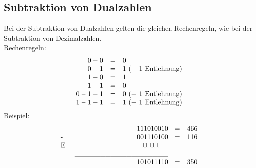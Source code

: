\documentclass[a4paper,12pt,fleqn,oneside]{article}
\begin{document}
	\subsection{Subtraktion von Dualzahlen}
  			Bei der Subtraktion von Dualzahlen gelten die gleichen Rechenregeln, wie bei der Subtraktion von Dezimalzahlen.\\
  			Rechenregeln:
			\[ \begin{array}{rcll}
   				 0 - 0 & = & 0													\\
  			         0 - 1 & = & 1$ (+ 1 Entlehnung)$									\\			
    				 1 - 0 & = & 1													\\
				 1 - 1 & = & 0													\\
    			    0 - 1 - 1 & = & 0$ (+ 1 Entlehnung)$									\\
    			    1 - 1 - 1 & = & 1$ (+ 1 Entlehnung)$
			\end{array} \]
			Beispiel:
			\[ \begin{array}{lrcll}
   					&		 	       	 1 1 1 0 1 0 0 1 0 		& = & 466 			\\
  			       	$- $ &				 0 0 1 1 1 0 1 0 0 		& = & 116				\\
  			       	$E $ &      			            1 1 1 1 1$ $$ $$ $$ $        	 				\\            
    					&	\_\_\_\_\_\_\_\_\_\_\_\_\_\_\_\_\_\_							\\
    			   		&			      	  1 0 1 0 1 1 1 1 0		 & = & 350
			\end{array} \]
			
\newpage
	
\end{document}
